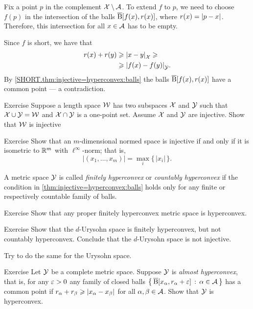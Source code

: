 Fix a point $p$ in the complement $\mathcal{X}\setminus \mathcal{A}$.
To extend $f$ to $p$, we need to choose $f(p)$ in the intersection of the balls 
$\overline{\mathrm{B}}{}[f(x),r(x)]$, where $r(x)=\dist{p}{x}{}$.
Therefore, this intersection for all $x\in \mathcal{A}$ has to be empty.

Since $f$ is short, we have that 
\begin{align*}
r(x)+r(y)&\ge \dist{x}{y}{\spc{X}}\ge
\\
&\ge \dist{f(x)}{f(y)}{\spc{Y}}.
\end{align*}
By \ref{SHORT.thm:injective=hyperconvex:balls} the balls 
$\overline{\mathrm{B}}{}[f(x),r(x)]$ have a common point --- a contradiction. 
\qeds

\begin{thm}{Exercise}\label{ex:one-point-gluing}
Suppose a length space $\mathcal{W}$ has two subspaces $\mathcal{X}$ and $\mathcal{Y}$ such that $\mathcal{X}\cup\mathcal{Y}=\mathcal{W}$ and $\mathcal{X}\cap\mathcal{Y}$ is a one-point set.
Assume $\mathcal{X}$ and $\mathcal{Y}$ are injective.
Show that  $\mathcal{W}$ is injective
\end{thm}

\begin{thm}{Exercise}\label{ex:Rm-ell-infty}
Show that an $m$-dimensional normed space is injective if and only if it is isometric to $\mathbb{R}^m$ with $\ell^\infty$-norm; that is,
\[|(x_1,\dots,x_m)|=\max_i\{\,|x_i|\,\}.\]
\end{thm}

A metric space $\mathcal{Y}$ is called \emph{finitely hyperconvex} or \emph{countably hyperconvex} if the condition in \ref{thm:injective=hyperconvex:balls} holds only for any finite or respectively countable family of balls.

\begin{thm}{Exercise}\label{ex:compact-hyperconvex}
Show that any proper finitely hyperconvex metric space is hyperconvex.
\end{thm}


\begin{thm}{Exercise}\label{ex:urysohn-hyperconvex}
Show that the $d$-Urysohn space is finitely hyperconvex, but not countably hyperconvex.
Conclude that the $d$-Urysohn space is not injective.

Try to do the same for the Urysohn space.
\end{thm}

\begin{thm}{Exercise}\label{ex:almost-hyperconvex}
Let $\mathcal{Y}$ be a complete metric space.
Suppose $\mathcal{Y}$ is \emph{almost hyperconvex},
that is, for any $\varepsilon>0$ any family of closed balls $\left\{\,{\overline{\mathrm{B}}{}[x_\alpha,r_\alpha+\varepsilon]}\,:\,{\alpha\in\mathcal{A}}\,\right\}$ has a common point if 
$r_\alpha+r_\beta\ge \dist{x_\alpha}{x_\beta}{}$ for all $\alpha,\beta\in \mathcal{A}$.
Show that $\mathcal{Y}$ is hyperconvex.
\end{thm}


